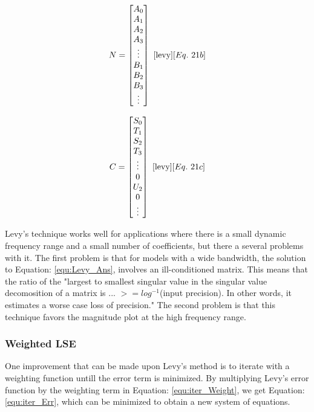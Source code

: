 \begin{multicols}{2}
\begin{equation}
\label{equ:Levy_N}
N = 
\begin{bmatrix}
A_0 \\
A_1 \\
A_2 \\
A_3 \\
\vdots \\
B_1 \\
B_2 \\
B_3 \\
\vdots
\end{bmatrix}
~\cite{levy}[Eq.~21b]
\end{equation}

\begin{equation}
\label{equ:Levy_C}
C = 
\begin{bmatrix}
S_0 \\
T_1 \\
S_2 \\
T_3 \\
\vdots \\
0   \\
U_2 \\
0   \\
\vdots
\end{bmatrix}
~\cite{levy}[Eq.~21c]
\end{equation}
\end{multicols}

Levy's technique works well for applications where there is a small dynamic frequency range and a small number of coefficients, but there a several problems with it.
The first problem is that for models with a wide bandwidth, the solution to Equation: \eqref{equ:Levy_Ans}, involves an ill-conditioned matrix. This means that the ratio of the "largest to smallest singular value in the singular value decomosition of a matrix is ... $>= log^{-1}$(input precision). In other words, it estimates a worse case loss of precision."
The second problem is that this technique favors the magnitude plot at the high frequency range. 



\subsubsection{Weighted LSE}
\label{sec:weightedLSE}
One improvement that can be made upon Levy's method is to iterate with a weighting function untill the error term is minimized\cite{levy_iter}. By multiplying Levy's error function by the weighting term in Equation: \eqref{equ:iter_Weight}, we get Equation: \eqref{equ:iter_Err}, which can be minimized to obtain a new system of equations.

